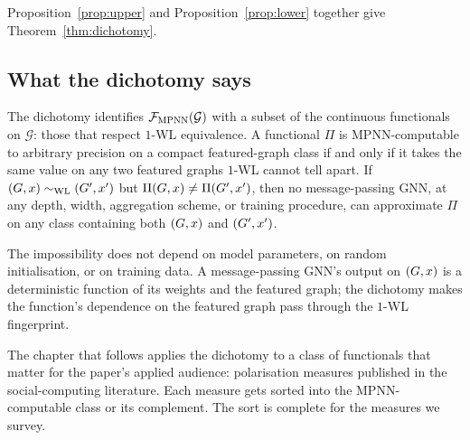 Proposition~\ref{prop:upper} and Proposition~\ref{prop:lower} together give
Theorem~\ref{thm:dichotomy}.

\subsection{What the dichotomy says}

The dichotomy identifies $\mathcal{F}_{\mathrm{MPNN}}(\mathcal{G})$ with a
subset of the continuous functionals on $\mathcal{G}$: those that
respect $1$-WL equivalence. A functional $\Pi$ is MPNN-computable to
arbitrary precision on a compact featured-graph class if and only if
it takes the same value on any two featured graphs $1$-WL cannot
tell apart. If $(G, x) \sim_{\mathrm{WL}} (G', x')$ but $\Pi(G, x)
\neq \Pi(G', x')$, then no message-passing GNN, at any depth,
width, aggregation scheme, or training procedure, can approximate
$\Pi$ on any class containing both $(G, x)$ and $(G', x')$.

The impossibility does not depend on model parameters, on random
initialisation, or on training data. A message-passing GNN's output
on $(G, x)$ is a deterministic function of its weights and the
featured graph; the dichotomy makes the function's dependence on the
featured graph pass through the $1$-WL fingerprint.

The chapter that follows applies the dichotomy to a class of
functionals that matter for the paper's applied audience:
polarisation measures published in the social-computing literature.
Each measure gets sorted into the MPNN-computable class or its
complement. The sort is complete for the measures we survey.
